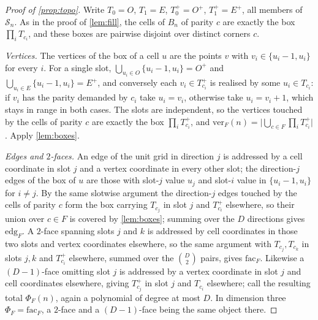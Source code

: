 \documentclass[11pt]{amsart}
\theoremstyle{definition}
\theoremstyle{remark}
\begin{document}
\begin{proof}[Proof of \cref{prop:topo}]
Write $T_{0}=O$, $T_{1}=E$, $T^{+}_{0}=O^{+}$, $T^{+}_{1}=E^{+}$, all members of $\mathcal{S}_{n}$. As in the proof of \cref{lem:fill}, the cells of $B_{n}$ of parity $c$ are exactly the box $\prod_{i}T_{c_{i}}$, and these boxes are pairwise disjoint over distinct corners $c$.

\emph{Vertices.} The vertices of the box of a cell $u$ are the points $v$ with $v_{i} \in \{u_{i}-1,u_{i}\}$ for every $i$. For a single slot, $\bigcup_{u_{i} \in O}\{u_{i}-1,u_{i}\} = O^{+}$ and $\bigcup_{u_{i} \in E}\{u_{i}-1,u_{i}\} = E^{+}$, and conversely each $v_{i} \in T^{+}_{c_{i}}$ is realised by some $u_{i} \in T_{c_{i}}$: if $v_{i}$ has the parity demanded by $c_{i}$ take $u_{i}=v_{i}$, otherwise take $u_{i}=v_{i}+1$, which stays in range in both cases. The slots are independent, so the vertices touched by the cells of parity $c$ are exactly the box $\prod_{i}T^{+}_{c_{i}}$, and $\mathrm{ver}_{F}(n) = \bigl|\bigcup_{c \in F}\prod_{i}T^{+}_{c_{i}}\bigr|$. Apply \cref{lem:boxes}.

\emph{Edges and $2$-faces.} An edge of the unit grid in direction $j$ is addressed by a cell coordinate in slot $j$ and a vertex coordinate in every other slot; the direction-$j$ edges of the box of $u$ are those with slot-$j$ value $u_{j}$ and slot-$i$ value in $\{u_{i}-1,u_{i}\}$ for $i \neq j$. By the same slotwise argument the direction-$j$ edges touched by the cells of parity $c$ form the box carrying $T_{c_{j}}$ in slot $j$ and $T^{+}_{c_{i}}$ elsewhere, so their union over $c \in F$ is covered by \cref{lem:boxes}; summing over the $D$ directions gives $\mathrm{edg}_{F}$. A $2$-face spanning slots $j$ and $k$ is addressed by cell coordinates in those two slots and vertex coordinates elsewhere, so the same argument with $T_{c_{j}},T_{c_{k}}$ in slots $j,k$ and $T^{+}_{c_{i}}$ elsewhere, summed over the $\binom{D}{2}$ pairs, gives $\mathrm{fac}_{F}$. Likewise a $(D-1)$-face omitting slot $j$ is addressed by a vertex coordinate in slot $j$ and cell coordinates elsewhere, giving $T^{+}_{c_{j}}$ in slot $j$ and $T_{c_{i}}$ elsewhere; call the resulting total $\Phi_{F}(n)$, again a polynomial of degree at most $D$. In dimension three $\Phi_{F}=\mathrm{fac}_{F}$, a $2$-face and a $(D-1)$-face being the same object there.


\end{proof}
\end{document}
